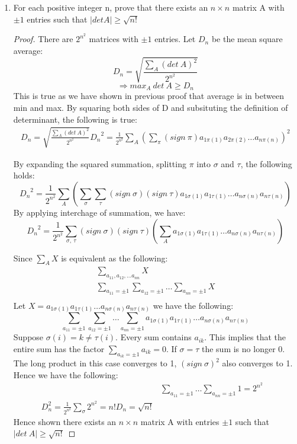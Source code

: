 \documentclass{article}
\begin{document}
\begin{enumerate} [label=\textbf{\arabic*}.]
	\item  For each positive integer n, prove that there exists an $n \times n$
		matrix A with $\pm 1$ entries such that $|det A| \ge \sqrt{n!}$
		\begin{proof}
			There are $2^{n^2}$ matrices with $\pm 1$ entries. Let $D_n$ be the mean
			square average:
			$$D_n=\sqrt{\frac{\sum_A (det\ A)^2}{2^{n^2}}}$$
			$$\Rightarrow max_A\ det\ A \ge D_n$$
			This is true as we have shown in previous proof that average is in between
			min and max. By squaring both sides of D and subsituting the definition of
			determinant, the following is true:
			\begin{align*}
				D_n=\sqrt{\frac{\sum_A (det\ A)^2}{2^{n^2}}}
				{D_n}^2=\frac{1}{2^{n^2}} \sum_A \left(\sum_{\pi} (sign\
				\pi)a_{1\pi(1)}a_{2\pi(2)} \dots a_{n\pi(n)}\right)^2
			\end{align*}

			By expanding the squared summation, splitting $\pi$ into $\sigma$ and
			$\tau$, the following holds:
				$${D_n}^2=\frac{1}{2^{n^2}} \sum_A \left(\sum_\sigma \sum_\tau (sign\
				\sigma)(sign\ \tau) a_{1\sigma(1)}a_{1\tau(1)} \dots a_{n\sigma(n)}a_{n\tau(n)} \right)$$
			By applying interchage of summation, we have:
			$${D_n}^2=\frac{1}{2^{n^2}} \sum_{\sigma ,\ \tau}  (sign\ \sigma)(sign\
			\tau) \left(\sum_A a_{1\sigma(1)}a_{1\tau(1)} \dots a_{n\sigma(n)}a_{n\tau(n)} \right)$$

			Since $\sum_A X$ is equivalent as the following: 
			\begin{align*}
				&\sum_{a_{11}, a_{12}, \dots a_{nn}} X &\\ 
				&\sum_{a_{11}=\pm 1} \sum_{a_{12}=\pm 1} \dots
				\sum_{a_{nn}=\pm 1} X &\\
			\end{align*}
			Let $X = a_{1\sigma(1)}a_{1\tau(1)} \dots a_{n\sigma(n)}a_{n\tau(n)}$ we
			have the following:
				$$\sum_{a_{11}=\pm 1} \sum_{a_{12}=\pm 1} \dots
				\sum_{a_{nn}=\pm 1} a_{1\sigma(1)}a_{1\tau(1)} \dots a_{n\sigma(n)}a_{n\tau(n)} $$
			Suppose $\sigma (i) = k \neq \tau (i)$. Every sum contains $a_{ik}$.
			This implies that the entire sum has the factor $\sum_{a_{ik}=\pm 1}
			a_{ik} = 0$. If $\sigma = \tau$ the sum is no longer 0. The long product
			in this case converges to 1, $(sign\ \sigma)^2$ also converges to 1.
			Hence we have the following:
			\begin{align*}
				&\sum_{a_{11}=\pm 1} \dots \sum_{a_{nn}=\pm 1} 1 = 2^{n^2}&\\
				D_n^2 = \frac{1}{2^{n^2}} \sum_\sigma 2^{n^2} = n!
				D_n = \sqrt{n!}
			\end{align*}
			Hence shown there exists an $n \times n$ matrix A with entries $\pm 1$
			such that $|det\ A| \ge \sqrt{n!}$
		\end{proof}
\end{enumerate}
\end{document}
